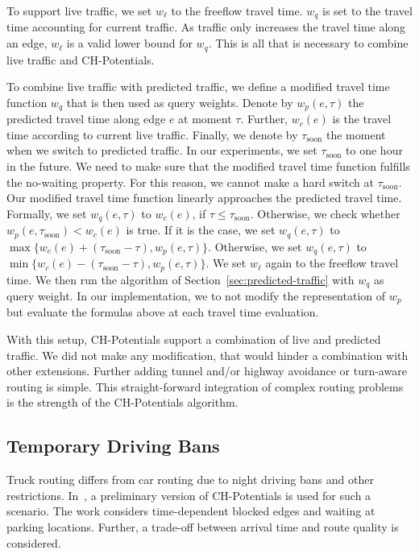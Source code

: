 \documentclass[letterpaper]{article} %
\begin{document}
To support live traffic, we set $w_\ell$ to the freeflow travel time.
$w_q$ is set to the travel time accounting for current traffic.
As traffic only increases the travel time along an edge, $w_\ell$ is a valid lower bound for $w_q$.
This is all that is necessary to combine live traffic and CH-Potentials.

To combine live traffic with predicted traffic, we define a modified travel time function $w_q$ that is then used as query weights.
Denote by $w_p(e,\tau)$ the predicted travel time along edge $e$ at moment $\tau$.
Further, $w_c(e)$ is the travel time according to current live traffic.
Finally, we denote by $\tau_{\mathrm{soon}}$ the moment when we switch to predicted traffic.
In our experiments, we set $\tau_{\mathrm{soon}}$ to one hour in the future.
We need to make sure that the modified travel time function fulfills the no-waiting property.
For this reason, we cannot make a hard switch at $\tau_{\mathrm{soon}}$.
Our modified travel time function linearly approaches the predicted travel time. %
%
Formally, we set $w_q(e,\tau)$ to $w_c(e)$, if $\tau \leq \tau_{\mathrm{soon}}$.
Otherwise, we check whether $w_p(e,\tau_{\mathrm{soon}}) < w_c(e)$ is true.
If it is the case, we set $w_q(e,\tau)$ to $\max\{w_c(e)+(\tau_{\mathrm{soon}}-\tau), w_p(e,\tau)\}$.
Otherwise, we set $w_q(e,\tau)$ to $\min\{w_c(e)-(\tau_{\mathrm{soon}}-\tau), w_p(e,\tau)\}$.
We set $w_\ell$ again to the freeflow travel time.
We then run the algorithm of Section~\ref{sec:predicted-traffic} with $w_q$ as query weight.
In our implementation, we to not modify the representation of $w_p$ but evaluate the formulas above at each travel time evaluation.

With this setup, CH-Potentials support a combination of live and predicted traffic.
We did not make any modification, that would hinder a combination with other extensions.
Further adding tunnel and/or highway avoidance or turn-aware routing is simple.
This straight-forward integration of complex routing problems is the strength of the CH-Potentials algorithm.

\subsection{Temporary Driving Bans}

Truck routing differs from car routing due to night driving bans and other restrictions.
In~\cite{kswz-erptd-20}, a preliminary version of CH-Potentials is used for such a scenario.
The work considers time-dependent blocked edges and waiting at parking locations.
Further, a trade-off between arrival time and route quality is considered.
\end{document}
